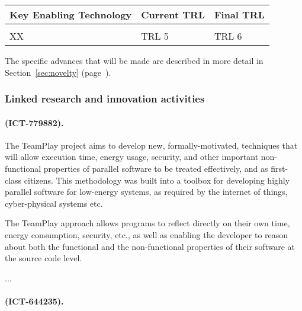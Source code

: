 \documentclass[a4paper,11pt]{article}
\begin{document}
\begin{center}
  \begin{tabular}{|p{4.9in}|l|l|}
    \hline
    \textbf{Key Enabling Technology} & \textbf{Current TRL} & \textbf{Final TRL} \\
    \hline
     &  & \\
    \hline XX & TRL 5 & TRL 6 \\  
    \hline
  \end{tabular}
\end{center}

\noindent
The specific advances that will be made are described in more detail in Section~\ref{sec:novelty} (page~\pageref{sec:novelty}).


\subsubsection{Linked research and innovation activities}
\label{projects}


\vspace{-8pt}
\paragraph{\teamplay (ICT-779882).}
The TeamPlay project aims to develop new, formally-motivated, techniques that will allow execution time, energy usage, security, and other important non-functional properties of parallel software to be treated effectively, and as first-class citizens. This methodology was built into a toolbox for developing highly parallel software for low-energy systems, as required by the internet of things, cyber-physical systems etc.

The TeamPlay approach allows programs to reflect directly on their own time, energy consumption, security, etc., as well as enabling the developer to reason about both the functional and the non-functional properties of their software at the source code level.

...
\vspace{-8pt}
\paragraph{\rephrase (ICT-644235).}
\end{document}
